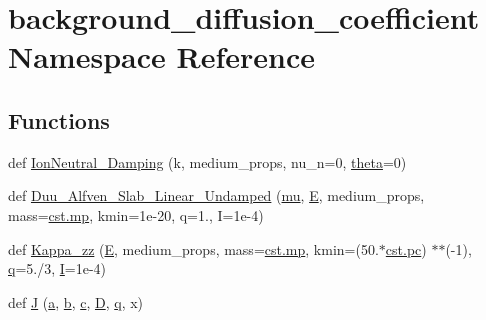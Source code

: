 \hypertarget{namespacebackground__diffusion__coefficient}{}\section{background\+\_\+diffusion\+\_\+coefficient Namespace Reference}
\label{namespacebackground__diffusion__coefficient}
\subsection*{Functions}
\begin{DoxyCompactItemize}
\item 
def \hyperlink{namespacebackground__diffusion__coefficient_aebebdbdd7bf44f9ebd3485b6abe00093}{Ion\+Neutral\+\_\+\+Damping} (k, medium\+\_\+props, nu\+\_\+n=0, \hyperlink{cr__source_8h_a91a3bf9ce71325c8a7cbd31d8c474bff}{theta}=0)
\item 
def \hyperlink{namespacebackground__diffusion__coefficient_a98bcd7e8761c065f7586e89f4d9050c8}{Duu\+\_\+\+Alfven\+\_\+\+Slab\+\_\+\+Linear\+\_\+\+Undamped} (\hyperlink{namespacebackground__diffusion__coefficient_aff54de3ac975c901763d9ead73135baf}{mu}, \hyperlink{namespacebackground__diffusion__coefficient_a1d825f16046d1366622e80b27c5abe8f}{E}, medium\+\_\+props, mass=\hyperlink{constants_8h_a6b331c08a80ed71d31c55a3341776483}{cst.\+mp}, kmin=1e-\/20, q=1., I=1e-\/4)
\item 
def \hyperlink{namespacebackground__diffusion__coefficient_a90de23556ff1b6647c805b26e421a00f}{Kappa\+\_\+zz} (\hyperlink{namespacebackground__diffusion__coefficient_a1d825f16046d1366622e80b27c5abe8f}{E}, medium\+\_\+props, mass=\hyperlink{constants_8h_a6b331c08a80ed71d31c55a3341776483}{cst.\+mp}, kmin=(50.$\ast$\hyperlink{constants_8h_a2884cd030c4c825754349a525a1d06ce}{cst.\+pc}) $\ast$$\ast$(-\/1), \hyperlink{namespacebackground__diffusion__coefficient_a24c8ca7d427bce7fc5fffc26e51655c4}{q}=5./3, \hyperlink{namespacebackground__diffusion__coefficient_af732e0e9d46a756c465592e68f78dd2d}{I}=1e-\/4)
\item 
def \hyperlink{namespacebackground__diffusion__coefficient_a751d44e9536ec7a83b768e7829c8ea95}{J} (\hyperlink{namespacebackground__diffusion__coefficient_a136aa61656385e49855d586138d39374}{a}, \hyperlink{namespacebackground__diffusion__coefficient_a1c03ac6c07803cd1cd40a72d62e554f8}{b}, \hyperlink{namespacebackground__diffusion__coefficient_a01bae0e931fba5b49a75b9e7aace34eb}{c}, \hyperlink{namespacebackground__diffusion__coefficient_a49751c69870f10700f7e674b48ea1d7d}{D}, \hyperlink{namespacebackground__diffusion__coefficient_a24c8ca7d427bce7fc5fffc26e51655c4}{q}, x)
\end{DoxyCompactItemize}

